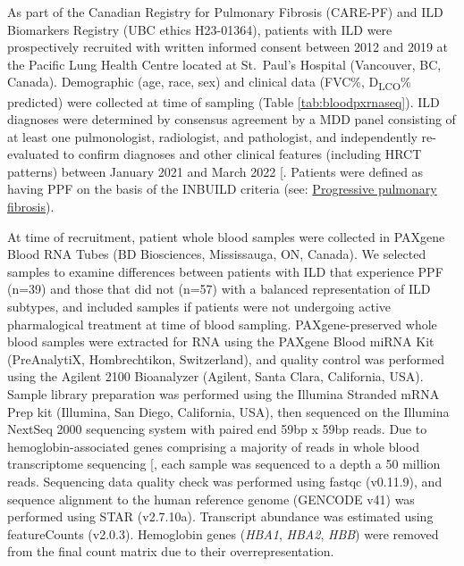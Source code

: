 \documentclass[
]{article}
\begin{document}
As part of the Canadian Registry for Pulmonary Fibrosis (CARE-PF) and ILD Biomarkers Registry (UBC ethics H23-01364), patients with ILD were prospectively recruited with written informed consent between 2012 and 2019 at the Pacific Lung Health Centre located at St.~Paul's Hospital (Vancouver, BC, Canada). Demographic (age, race, sex) and clinical data (FVC\%, D\textsubscript{LCO}\% predicted) were collected at time of sampling (Table \ref{tab:bloodpxrnaseq}). ILD diagnoses were determined by consensus agreement by a MDD panel consisting of at least one pulmonologist, radiologist, and pathologist, and independently re-evaluated to confirm diagnoses and other clinical features (including HRCT patterns) between January 2021 and March 2022 {[}\citeproc{ref-marinescu_integration_2023}{121}{]}. Patients were defined as having PPF on the basis of the INBUILD criteria (see: \hyperref[ppf]{Progressive pulmonary fibrosis}).

At time of recruitment, patient whole blood samples were collected in PAXgene Blood RNA Tubes (BD Biosciences, Mississauga, ON, Canada). We selected samples to examine differences between patients with ILD that experience PPF (n=39) and those that did not (n=57) with a balanced representation of ILD subtypes, and included samples if patients were not undergoing active pharmalogical treatment at time of blood sampling. PAXgene-preserved whole blood samples were extracted for RNA using the PAXgene Blood miRNA Kit (PreAnalytiX, Hombrechtikon, Switzerland), and quality control was performed using the Agilent 2100 Bioanalyzer (Agilent, Santa Clara, California, USA). Sample library preparation was performed using the Illumina Stranded mRNA Prep kit (Illumina, San Diego, California, USA), then sequenced on the Illumina NextSeq 2000 sequencing system with paired end 59bp x 59bp reads. Due to hemoglobin-associated genes comprising a majority of reads in whole blood transcriptome sequencing {[}\citeproc{ref-shin_variation_2014}{122}{]}, each sample was sequenced to a depth a 50 million reads. Sequencing data quality check was performed using fastqc (v0.11.9), and sequence alignment to the human reference genome (GENCODE v41) was performed using STAR (v2.7.10a). Transcript abundance was estimated using featureCounts (v2.0.3). Hemoglobin genes (\textit{HBA1}, \textit{HBA2}, \textit{HBB}) were removed from the final count matrix due to their overrepresentation.
\end{document}
